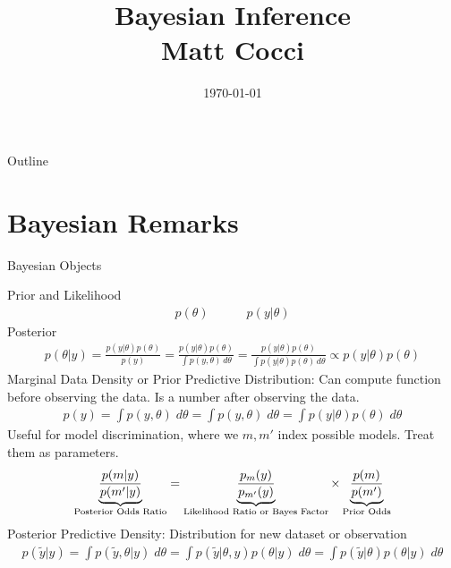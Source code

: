 \documentclass[aspectratio=169, handout]{beamer}
\title[]{Bayesian Inference \\ Matt Cocci}
\author[]{}
\date{\today}
\begin{document}
\begin{frame}[plain]
\titlepage
\end{frame}


\begin{frame}{Outline}
\tableofcontents[hideallsubsections]
\end{frame}




\section{Bayesian Remarks}


{\scriptsize
\begin{frame}{Bayesian Objects}

\alert{Prior} and \alert{Likelihood}
\begin{align*}
  p(\theta)
  \qquad\quad
  p(y|\theta)
\end{align*}
\alert{Posterior}
\begin{align*}
  p(\theta|y)
  =
  \frac{p(y|\theta)p(\theta)}{p(y)}
  =
  \frac{p(y|\theta)p(\theta)}{\int p(y,\theta)\,d\theta}
  =
  \frac{p(y|\theta)p(\theta)}{\int p(y|\theta)p(\theta)\,d\theta}
  \propto
  p(y|\theta)p(\theta)
\end{align*}
\alert{Marginal Data Density} or \alert{Prior Predictive Distribution}:
Can compute function before observing the data.
Is a number after observing the data.
\begin{align*}
  p(y)
  =
  \int
  p(y,\theta)
  \;
  d\theta
  =
  \int
  p(y,\theta)
  \;
  d\theta
  =
  \int
  p(y|\theta)
  p(\theta)
  \;
  d\theta
\end{align*}
Useful for model discrimination, where we $m,m'$ index possible models.
Treat them as parameters.
\begin{align*}
  \underbrace{%
    \frac{p(m|y)}{p(m'|y)}
  }_{\text{Posterior Odds Ratio}}
  =
  \underbrace{%
    \frac{p_m(y)}{p_{m'}(y)}
  }_{\text{Likelihood Ratio or Bayes Factor}}
  \times
  \underbrace{%
    \frac{p(m)}{p(m')}
  }_{\text{Prior Odds}}
\end{align*}
\alert{Posterior Predictive Density}:
Distribution for new dataset or observation
\begin{align*}
  p(\tilde{y}|y)
  =
  \int
  p(\tilde{y},\theta|y)
  \;
  d\theta
  =
  \int
  p(\tilde{y}|\theta,y)
  p(\theta|y)
  \;
  d\theta
  =
  \int
  p(\tilde{y}|\theta)
  p(\theta|y)
  \;
  d\theta
\end{align*}

\end{frame}
}
\end{document}
